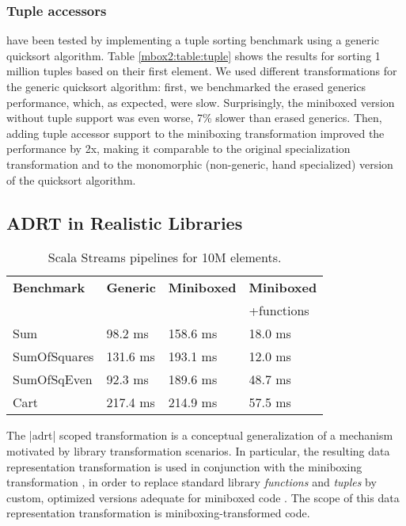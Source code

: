 \subsubsection*{Tuple accessors} have been tested by implementing a tuple sorting benchmark using a generic quicksort algorithm. Table \ref{mbox2:table:tuple} shows the results for sorting 1 million tuples based on their first element. We used different transformations for the generic quicksort algorithm: first, we benchmarked the erased generics performance, which, as expected, were slow. Surprisingly, the miniboxed version without tuple support was even worse, 7\% slower than erased generics. Then, adding tuple accessor support to the miniboxing transformation improved the performance by 2x, making it comparable to the original specialization transformation and to the monomorphic (non-generic, hand specialized) version of the quicksort algorithm.

\subsection{ADRT in Realistic Libraries}
\label{mbox2:sec:benchmarks:funcs}

\begin{table}[t]
  \begin{tabularx}{0.98\textwidth}{|g *{3}{|Y}|} \hline
    \textbf{Benchmark} & \textbf{Generic} & \textbf{Miniboxed}& \textbf{Miniboxed} \\
                       &                  &                   & +functions \\ \hline
    Sum                &          98.2 ms &          158.6 ms &             18.0 ms \\
    SumOfSquares       &         131.6 ms &          193.1 ms &             12.0 ms \\
    SumOfSqEven        &          92.3 ms &          189.6 ms &             48.7 ms \\
    Cart               &         217.4 ms &          214.9 ms &             57.5 ms \\ \hline
  \end{tabularx}

  \caption{Scala Streams pipelines for 10M elements.}
  \label{mbox2:table:streams}

\end{table}

The |adrt| scoped transformation is a conceptual generalization of a mechanism
motivated by library transformation scenarios. In particular, the
resulting data representation transformation is used in conjunction
with the miniboxing transformation \cite{miniboxing-www, miniboxing},
in order to replace standard library \emph{functions} and \emph{tuples}
by custom, optimized versions adequate for miniboxed code \cite{miniboxing-pppj}.
The scope of this data representation transformation is miniboxing-transformed code.

